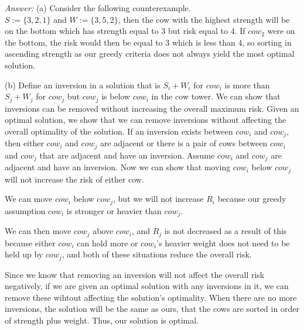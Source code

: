 \documentclass[12pt]{article}
\begin{document}
\textit{Answer:}
(a) Consider the following counterexample.\\
$S:=\{3,2,1\}$ and $W:=\{3,5,2\}$, then the cow with the highest strength will be on the bottom which has strength equal to 3 but risk equal to 4. If $cow_2$ were on the bottom, the risk would then be equal to 3 which is less than 4, so sorting in ascending strength as our greedy criteria does not always yield the most optimal solution.

(b) Define an inversion in a solution that is $S_i+W_i$ for $cow_i$ is more than $S_j+W_j$ for $cow_j$ but $cow_j$ is below $cow_i$ in the cow tower. We can show that inversions can be removed without increasing the overall maximum risk. Given an optimal solution, we show that we can remove inversions without affecting the overall optimality of the solution. If an inversion exists between $cow_i$ and $cow_j$, then either $cow_i$ and $cow_j$ are adjacent or there is a pair of cows between $cow_i$ and $cow_j$ that are adjacent and have an inversion. Assume $cow_i$ and $cow_j$ are adjacent and have an inversion. Now we can show that moving $cow_i$ below $cow_j$ will not increase the risk of either cow.

We can move $cow_i$ below $cow_j$, but we will not increase $R_i$ because our greedy assumption $cow_i$ is stronger or heavier than  $cow_j$.

We can then move $cow_j$ above $cow_i$, and $R_j$ is not decreased as a result of this because either $cow_i$ can hold more or $cow_i$'s heavier weight does not need to be held up by $cow_j$, and both of these situations reduce the overall risk.

Since we know that removing an inversion will not affect the overall risk negatively, if we are given an optimal solution with any inversions in it, we can remove these wihtout affecting the solution's optimality. When there are no more inversions, the solution will be the same as ours, that the cows are sorted in order of strength plus weight. Thus, our solution is optimal.
\end{document}
